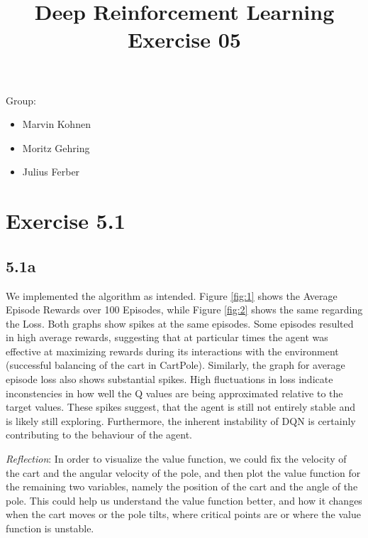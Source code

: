 \documentclass{article} %
\begin{document}
	
	\title{Deep Reinforcement Learning Exercise 05}
	\maketitle
	
	Group:
	\begin{itemize}
		\item Marvin Kohnen
		\item Moritz Gehring
		\item Julius Ferber 
		
	\end{itemize}
	\section{Exercise 5.1}
	
	\subsection{5.1a}
	We implemented the algorithm as intended.
	Figure \ref{fig:1} shows the Average Episode Rewards over 100 Episodes, while Figure \ref{fig:2} shows the same regarding the Loss. Both graphs show spikes at the same episodes. 
	Some episodes resulted in high average rewards, suggesting that at particular times the agent was effective at maximizing rewards during its interactions with the environment (successful balancing of the cart in CartPole). Similarly, the graph for average episode loss also shows substantial spikes. High fluctuations in loss indicate inconstencies in how well the Q values are being approximated relative to the target values. These spikes suggest, that the agent is still not entirely stable and is likely still exploring. Furthermore, the inherent instability of DQN is certainly contributing to the behaviour of the agent. 
	
	\textit{Reflection}:
	In order to visualize the value function, we could fix the velocity of the cart and the angular velocity of the pole, and then plot the value function for the remaining two variables, namely the position of the cart and the angle of the pole.
	This could help us understand the value function better, and how it changes when the cart moves or the pole tilts, where critical points are or where the value function is unstable.
	
\end{document}
